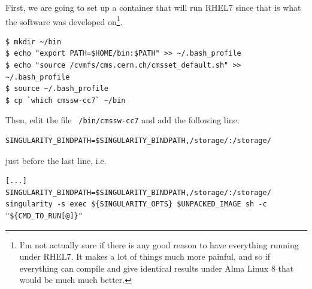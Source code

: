 \documentclass[12pt]{report}
\begin{document}
First, we are going to set up a container that will run RHEL7 since that is
what the software was developed on\footnote{I'm not actually sure if there is
any good reason to have everything running under RHEL7. It makes a lot of
things much more painful, and so if everything can compile and give identical
results under Alma Linux 8 that would be much much better.}.

\begin{mdframed}[backgroundcolor=light-gray, roundcorner=10pt,leftmargin=1, rightmargin=1, innerleftmargin=15, innertopmargin=15,innerbottommargin=15, outerlinewidth=1, linecolor=light-gray,roundcorner=20pt]
\begin{lstlisting}
$ mkdir ~/bin
$ echo "export PATH=$HOME/bin:$PATH" >> ~/.bash_profile
$ echo "source /cvmfs/cms.cern.ch/cmsset_default.sh" >> ~/.bash_profile
$ source ~/.bash_profile
$ cp `which cmssw-cc7` ~/bin
\end{lstlisting}
\end{mdframed}

Then, edit the file \texttt{~/bin/cmssw-cc7} and add the following line:

\begin{mdframed}[backgroundcolor=light-gray, roundcorner=10pt,leftmargin=1, rightmargin=1, innerleftmargin=15, innertopmargin=15,innerbottommargin=15, outerlinewidth=1, linecolor=light-gray,roundcorner=20pt]
\begin{lstlisting}
SINGULARITY_BINDPATH=$SINGULARITY_BINDPATH,/storage/:/storage/
\end{lstlisting}
\end{mdframed}

just before the last line, i.e.

\begin{mdframed}[backgroundcolor=light-gray, roundcorner=10pt,leftmargin=1, rightmargin=1, innerleftmargin=15, innertopmargin=15,innerbottommargin=15, outerlinewidth=1, linecolor=light-gray,roundcorner=20pt]
\begin{lstlisting}
[...]
SINGULARITY_BINDPATH=$SINGULARITY_BINDPATH,/storage/:/storage/
singularity -s exec ${SINGULARITY_OPTS} $UNPACKED_IMAGE sh -c "${CMD_TO_RUN[@]}"
\end{lstlisting}
\end{mdframed}
\end{document}
